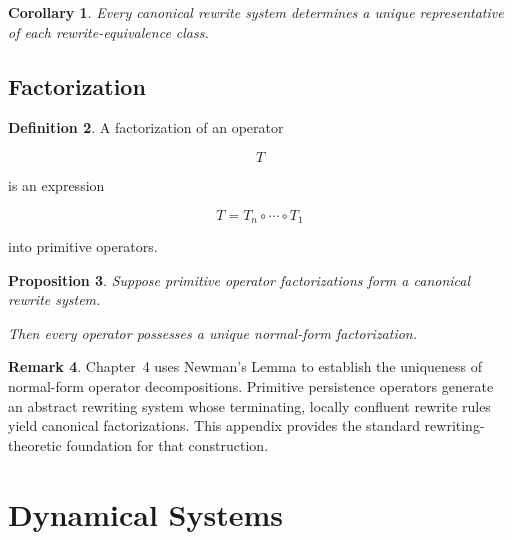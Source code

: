 \documentclass[11pt]{book}
\numberwithin{equation}{chapter}
\theoremstyle{definition}
\newtheorem{definition}{Definition}[chapter]
\newtheorem{remark}[definition]{Remark}
\theoremstyle{plain}
\newtheorem{proposition}[definition]{Proposition}
\newtheorem{corollary}[definition]{Corollary}
\begin{document}

\begin{corollary}

Every canonical rewrite system determines a unique representative of
each rewrite-equivalence class.

\end{corollary}


\section{Factorization}

\begin{definition}

A factorization of an operator

\[
T
\]

is an expression

\[
T
=
T_n
\circ
\cdots
\circ
T_1
\]

into primitive operators.

\end{definition}


\begin{proposition}

Suppose primitive operator factorizations form a canonical rewrite
system.

Then every operator possesses a unique normal-form factorization.

\end{proposition}


\begin{remark}

Chapter~4 uses Newman's Lemma to establish the uniqueness of normal-form
operator decompositions. Primitive persistence operators generate an
abstract rewriting system whose terminating, locally confluent rewrite
rules yield canonical factorizations. This appendix provides the
standard rewriting-theoretic foundation for that construction.

\end{remark}

\chapter{Dynamical Systems}
\end{document}

